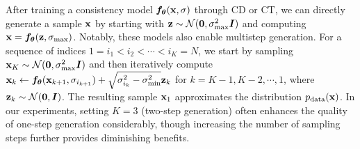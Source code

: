 After training a consistency model ${\bm{f}}_{\bm{\theta}}({\mathbf{x}}, \sigma)$ through CD or CT, we can directly generate a sample ${\mathbf{x}}$ by starting with ${\mathbf{z}} \sim \mathcal{N}(\bm{0}, \sigma_\text{max}^2{\bm{I}})$ and computing ${\mathbf{x}} = {\bm{f}}_{\bm{\theta}}({\mathbf{z}}, \sigma_\text{max})$. Notably, these models also enable multistep generation. For a sequence of indices $1 = i_1 < i_2 < \cdots < i_K = N$, we start by sampling ${\mathbf{x}}_{K} \sim \mathcal{N}(\bm{0}, \sigma_\text{max}^2 {\bm{I}})$ and then iteratively compute ${\mathbf{x}}_{k} \gets {\bm{f}}_{\bm{\theta}}({\mathbf{x}}_{k+1}, \sigma_{i_{k+1}}) + \sqrt{\sigma_{i_k}^2 - \sigma_\text{min}^2} {\mathbf{z}}_{k}$ for $k = K-1, K-2, \cdots, 1$, where ${\mathbf{z}}_{k} \sim \mathcal{N}(\bm{0}, {\bm{I}})$. The resulting sample ${\mathbf{x}}_{1}$ approximates the distribution $p_\text{data}({\mathbf{x}})$. In our experiments, setting $K=3$ (two-step generation) often enhances the quality of one-step generation considerably, though increasing the number of sampling steps further provides diminishing benefits.



